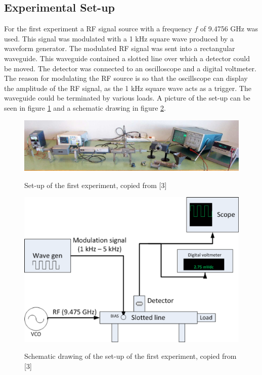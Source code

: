 \documentclass[11pt,a4paper]{article}
\begin{document}
\subsection{Experimental Set-up}
For the first experiment a RF signal source with a frequency $f$ of 9.4756 GHz was used. This signal was modulated with a 1 kHz square wave produced by a waveform generator. The modulated RF signal was sent into a rectangular waveguide. This waveguide contained a slotted line over which a detector could be moved. The detector was connected to an oscilloscope and a digital voltmeter. The reason for modulating the RF source is so that the oscillscope can display the amplitude of the RF signal, as the 1 kHz square wave acts as a trigger. The waveguide could be terminated by various loads. A picture of the set-up can be seen in figure \ref{fig:opstelling1} and a schematic drawing in figure \ref{fig:opstelling1schema}.

\begin{figure}[H]
\centering
\includegraphics[scale=1]{opstelling1.png}
\label{fig:opstelling1}
\caption{Set-up of the first experiment, copied from [3]}
\end{figure}

\begin{figure}[H]
\centering
\includegraphics[scale=1]{opstelling1schema.png}
\label{fig:opstelling1schema}
\caption{Schematic drawing of the set-up of the first experiment, copied from [3]}
\end{figure}
\end{document}
